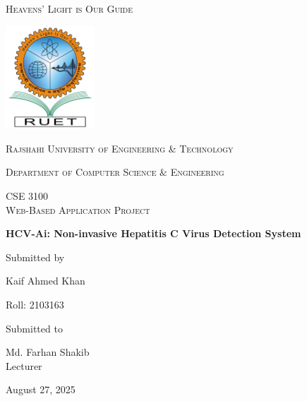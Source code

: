\documentclass[12pt,a4paper]{article}
\newcommand{\univ}{Rajshahi University of Engineering \& Technology}
\newcommand{\thedept}{Department of Computer Science \& Engineering}
\newcommand{\thecourse}{CSE 3100 \\ Web-Based Application Project}
\newcommand{\labgraph}{HCV-Ai: Non-invasive Hepatitis C Virus Detection System}
\newcommand{\thetitle}{\labgraph}
\newcommand{\theauthor}{Kaif Ahmed Khan}
\newcommand{\thesupervisor}{Md. Farhan Shakib}
\newcommand{\lec}{Lecturer}
\newcommand{\thedesignation}{\lec}
\begin{document}
\begin{titlepage}
\centering
{\scshape Heavens' Light is Our Guide\par}\vspace{.25cm}
\includegraphics[width=0.25\textwidth]{logo}\par\vspace{1cm}
{\scshape\LARGE \univ\par}
\vspace{.5cm}
{\scshape\Large \thedept\par}
\vspace{1cm}
{\scshape\Large \thecourse\par}
\vspace{1cm}
{\huge\bfseries \thetitle\par}
\vspace{1cm}
Submitted by\par
{\Large \theauthor\par}
{\Large Roll: 2103163\par}
\vfill
Submitted to\par
{\Large \thesupervisor\\\thedesignation\par}
\vfill
{\large August 27, 2025\par}
\end{titlepage}
\tableofcontents
\listoffigures
\newpage






\end{document}
